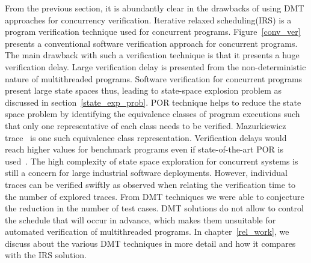 From the previous section, it is abundantly clear in the drawbacks of using DMT approaches for concurrency verification. 
Iterative relaxed scheduling(IRS) is a program verification technique used for concurrent programs. 
Figure~\ref{conv_ver} presents a conventional software verification approach for concurrent programs. 
The main drawback with such a verification technique is that it presents a huge verification delay. 
Large verification delay is presented from the non-deterministic nature of multithreaded programs. 
Software verification for concurrent programs present large state spaces thus, leading to state-space explosion problem as discussed in section~\ref{state_exp_prob}. 
POR technique helps to reduce the state space problem by identifying the equivalence classes of program executions such that only one representative of each class needs to be verified. 
Mazurkiewicz trace~\citep{mazurkiewicz1986trace} is one such equivalence class representation. 
Verification delays would reach higher values for benchmark programs even if state-of-the-art POR is used~\citep{abdulla2014optimal}\citep{gueta2007cartesian}. 
The high complexity of state space exploration for concurrent systems is still a concern for large industrial software deployments. 
However, individual traces can be verified swiftly as observed when relating the verification time to the number of explored traces. 
From DMT techniques we were able to conjecture the reduction in the number of test cases. 
DMT solutions do not allow to control the schedule that will occur in advance, which makes them unsuitable for automated verification of multithreaded programs. 
In chapter~\ref{rel_work}, we discuss about the various DMT techniques in more detail and how it compares with the IRS solution. 

